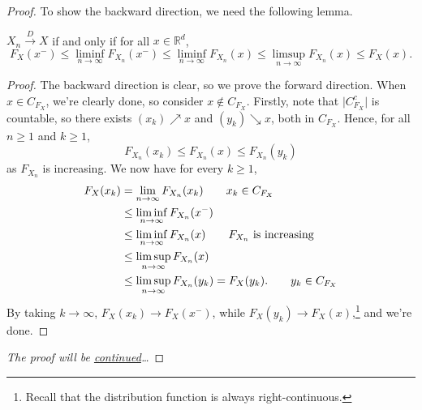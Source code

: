 \begin{proof}
	To show the backward direction, we need the following lemma.
	\begin{lemma}\label{lma:lec5}
		\(X_n \overset{D}{\to } X\) if and only if for all \(x \in \mathbb{R} ^d\),
		\[
			F_X(x^-)
			\leq \liminf_{n \to \infty} F_{X_n} (x^-)
			\leq \liminf_{n \to \infty} F_{X_n} (x)
			\leq \limsup_{n \to \infty} F_{X_n} (x)
			\leq F_X(x).
		\]
	\end{lemma}
	\begin{proof}
		The backward direction is clear, so we prove the forward direction. When \(x\in C_{F_X}\), we're clearly done, so consider \(x \notin C_{F_X}\). Firstly, note that \(\vert C_{F_X}^{c} \vert \) is countable, so there exists \((x_k) \nearrow x\) and \((y_k) \searrow x\), both in \(C_{F_X}\). Hence, for all \(n \geq 1\) and \(k \geq 1\),
		\[
			F_{X_n}(x_k)
			\leq F_{X_n}(x)
			\leq F_{X_n}(y_k)
		\]
		as \(F_{X_n}\) is increasing. We now have for every \(k \geq 1\),
		\begin{align*}
			F_X(x_k)
			 & = \lim_{n \to \infty} F_{X_n}(x_k) \tag*{\(x_k \in C_{F_X}\)}           \\
			 & \leq \liminf_{n \to \infty} F_{X_n}(x^-)                                \\
			 & \leq \liminf_{n \to \infty} F_{X_n}(x) \tag*{\(F_{X_n}\) is increasing} \\
			 & \leq \limsup_{n \to \infty} F_{X_n}(x)                                  \\
			 & \leq \limsup_{n \to \infty} F_{X_n}(y_k)
			= F_X(y_k). \tag*{\(y_k \in C_{F_X}\)}
		\end{align*}
		By taking \(k \to \infty \), \(F_X(x_k) \to F_X(x^-)\), while \(F_X(y_k) \to F_X(x)\),\footnote{Recall that the distribution function is always right-continuous.} and we're done.
	\end{proof}
	\emph{The proof will be \hyperref[pf:thm:weak-convergence-is-convergence-in-distribution]{continued}\dots}
\end{proof}